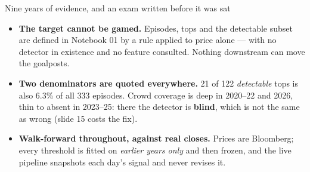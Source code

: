 \documentclass[aspectratio=169,11pt]{beamer}
\begin{document}
\begin{frame}{Nine years of evidence, and an exam written before it was sat}
  \hfill
  \hfill
  \hfill
  \vspace{0.9em}

  \begin{itemize}\footnotesize
    \item \textbf{The target cannot be gamed.} Episodes, tops and the
      detectable subset are defined in Notebook 01 by a rule applied to price
      alone --- with no detector in existence and no feature consulted. Nothing
      downstream can move the goalposts.
    \item \textbf{Two denominators are quoted everywhere.} 21 of 122
      \emph{detectable} tops is also 6.3\% of all 333 episodes. Crowd coverage
      is deep in 2020--22 and 2026, thin to absent in 2023--25: there the
      detector is \textbf{blind}, which is not the same as wrong (slide 15
      costs the fix).
    \item \textbf{Walk-forward throughout, against real closes.} Prices are
      Bloomberg; every threshold is fitted on \emph{earlier years only} and
      then frozen, and the live pipeline snapshots each day's signal and never
      revises it.
  \end{itemize}
\end{frame}
\end{document}
